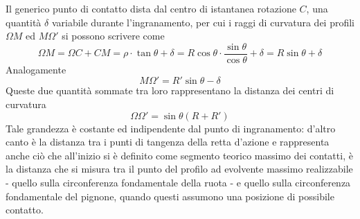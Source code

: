 \documentclass[a4paper, 15pt]{article}
\begin{document}
\begin{adjustwidth}{2in}{}
		Il generico punto di contatto dista dal centro di istantanea rotazione $C$, una quantità $\delta$ variabile durante l'ingranamento, per cui i raggi di curvatura dei profili $\Omega M$ ed $M\Omega'$ si possono scrivere come 
		\[\Omega M = \Omega C +CM = \rho\cdot\tan\theta + \delta = R\cos\theta\cdot\dfrac{\sin\theta}{\cos\theta} + \delta = R\sin\theta +\delta\]
		Analogamente 
		\[M\Omega' = R'\sin\theta-\delta\]		
		Queste due quantità sommate tra loro rappresentano la distanza dei centri di curvatura 
		\[\Omega\Omega' = \sin\theta(R+R')\] 				
		Tale grandezza è costante ed indipendente dal punto di ingranamento: d'altro canto è la distanza tra i punti di tangenza della retta d'azione e rappresenta anche ciò che all'inizio si è definito come segmento teorico massimo dei contatti, è la distanza che si misura tra il punto del profilo ad evolvente massimo realizzabile - quello sulla circonferenza fondamentale della ruota - e quello sulla circonferenza fondamentale del pignone, quando questi assumono una posizione di possibile contatto. 
\end{adjustwidth}
\end{document}
